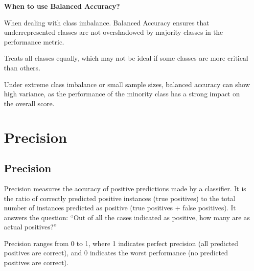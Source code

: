 \textbf{When to use Balanced Accuracy?}

When dealing with class imbalance. Balanced Accuracy ensures that underrepresented classes are not overshadowed by majority classes in the performance metric.

{
\item Treats all classes equally, which may not be ideal if some classes are more critical than others.
\item Under extreme class imbalance or small sample sizes, balanced accuracy can show high variance, as the performance of the minority class has a strong impact on the overall score.
}

\clearpage
\thispagestyle{classificationstyle}
\section{Precision}
\subsection{Precision}

Precision measures the accuracy of positive predictions made by a classifier. It is the ratio of correctly predicted positive instances (true positives) to
the total number of instances predicted as positive (true positives + false positives). It answers the question: “Out of all the cases indicated as positive, how many are as actual positives?”

\begin{center}
\end{center}

Precision ranges from 0 to 1, where 1 indicates perfect precision (all predicted positives are correct), and 0 indicates the worst performance (no predicted positives are correct).

